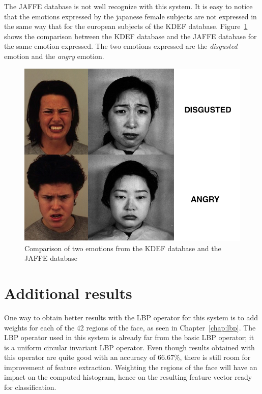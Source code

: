 \noindent The JAFFE database is not well recognize with this system. It is easy to notice that the emotions expressed by the japanese female subjects are not expressed in the same way that for the european subjects of the KDEF database. Figure~\ref{result_jaffe_kdef_comparison} shows the comparison between the KDEF database and the JAFFE database for the same emotion expressed. The two emotions expressed are the \textit{disgusted} emotion and the \textit{angry} emotion.
\newline

\begin{figure}[!h]
\begin{center}
\noindent \includegraphics[scale=0.4]{figures/result_jaffe_kdef_comparison} 
\newline
\caption{Comparison of two emotions from the KDEF database and the JAFFE database}
\label{result_jaffe_kdef_comparison}
\end{center} 
\end{figure}

\section{Additional results}

\vspace{\baselineskip}
\noindent One way to obtain better results with the LBP operator for this system is to add weights for each of the 42 regions of the face, as seen in Chapter~\ref{chap:lbp}. The LBP operator used in this system is already far from the basic LBP operator; it is a uniform circular invariant LBP operator. Even though results obtained with this operator are quite good with an accuracy of $ 66.67\% $, there is still room for improvement of feature extraction. Weighting the regions of the face will have an impact on the computed histogram, hence on the resulting feature vector ready for classification. \newline

